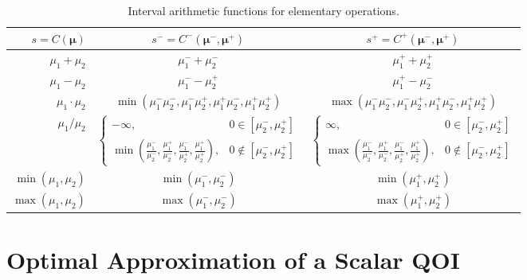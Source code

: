 \documentclass[graybox]{svmult}
\begin{document}
\begin{table}[t]
\begin{tabular}{r  c  c}
    $s=C(\boldsymbol{\mu})$ & $s^- = C^-(\boldsymbol{\mu}^-,\boldsymbol{\mu}^+)$ & $s^+ = C^+(\boldsymbol{\mu}^-,\boldsymbol{\mu}^+)$ \\
    \hline
    $\mu_1+\mu_2$ & $\mu_1^-+\mu_2^-$ & $\mu_1^++\mu_2^+$ \\
    $\mu_1-\mu_2$ & $\mu_1^--\mu_2^+$ & $\mu_1^+-\mu_2^-$ \\
    $\mu_1 \cdot \mu_2$ & $\min(\mu_1^-\mu_2^-,\mu_1^-\mu_2^+,\mu_1^+\mu_2^-,\mu_1^+\mu_2^+)$ & $\max(\mu_1^-\mu_2^-,\mu_1^-\mu_2^+,\mu_1^+\mu_2^-,\mu_1^+\mu_2^+)$ \\
    $\mu_1 / \mu_2$ & $\begin{cases} -\infty, & 0 \in [\mu_2^-,\mu_2^+] \\ \min\left(\frac{\mu_1^-}{\mu_2^-},\frac{\mu_1^+}{\mu_2^-},\frac{\mu_1^-}{\mu_2^+},\frac{\mu_1^+}{\mu_2^+}\right), & 0 \notin [\mu_2^-,\mu_2^+] \end{cases}$ & $\begin{cases} \infty, & 0 \in [\mu_2^-,\mu_2^+] \\ \max\left(\frac{\mu_1^-}{\mu_2^-},\frac{\mu_1^+}{\mu_2^-},\frac{\mu_1^-}{\mu_2^+},\frac{\mu_1^+}{\mu_2^+}\right), & 0 \notin [\mu_2^-,\mu_2^+] \end{cases}$ \\
    $\min(\mu_1,\mu_2)$ & $\min(\mu_1^-,\mu_2^-)$ & $\min(\mu_1^+,\mu_2^+)$ \\
    $\max(\mu_1,\mu_2)$ & $\max(\mu_1^-,\mu_2^-)$ & $\max(\mu_1^+,\mu_2^+)$ \\
    \hline
\end{tabular}
\caption{Interval arithmetic functions for elementary operations.}
\label{SoRa_table:elementary_ops_Cpm}
\end{table}

\section{Optimal Approximation of a Scalar QOI} \label{SoRa_sec:opt_comb_sol_sc}
\end{document}
